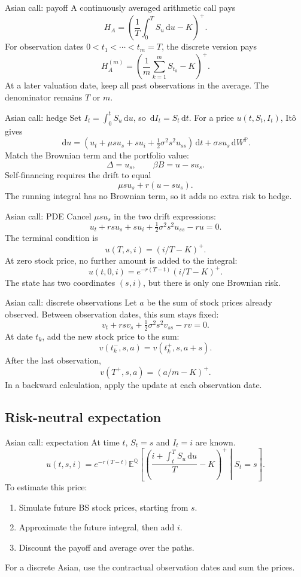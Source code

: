 \documentclass[handout,10pt,t,aspectratio=169]{beamer}
\newcommand{\E}{\mathbb E}
\newcommand{\Q}{\mathbb Q}
\newcommand{\Pp}{\mathbb P}
\newcommand{\dd}{\,\mathrm d}
\begin{document}
\begin{frame}{Asian call: payoff}
\small
A continuously averaged arithmetic call pays
\[
 H_A=\left(\frac1T\int_0^T S_u\dd u-K\right)^+.
\]
For observation dates \(0<t_1<\cdots<t_m=T\), the discrete version pays
\[
 H_A^{(m)}=\left(\frac1m\sum_{k=1}^m S_{t_k}-K\right)^+.
\]
At a later valuation date, keep all past observations in the average.
The denominator remains \(T\) or \(m\).
\end{frame}

\begin{frame}{Asian call: hedge}
\small
Set \(I_t=\int_0^tS_u\dd u\), so \(\dd I_t=S_t\dd t\).
For a price \(u(t,S_t,I_t)\), It\^o gives
\[
 \dd u=(u_t+\mu s u_s+s u_i+\tfrac12\sigma^2s^2u_{ss})\dd t
       +\sigma s u_s\dd W^\Pp.
\]
Match the Brownian term and the portfolio value:
\[
 \boxed{\Delta=u_s,\qquad\beta B=u-su_s.}
\]
Self-financing requires the drift to equal
\[
 \mu s u_s+r(u-su_s).
\]
The running integral has no Brownian term, so it adds no extra risk to hedge.
\end{frame}

\begin{frame}{Asian call: PDE}
\small
Cancel \(\mu s u_s\) in the two drift expressions:
\[
 \boxed{u_t+rsu_s+s u_i+\tfrac12\sigma^2s^2u_{ss}-ru=0.}
\]
The terminal condition is
\[
 u(T,s,i)=(i/T-K)^+.
\]
At zero stock price, no further amount is added to the integral:
\[
 u(t,0,i)=e^{-r(T-t)}(i/T-K)^+.
\]
The state has two coordinates \((s,i)\), but there is only one Brownian risk.
\end{frame}

\begin{frame}{Asian call: discrete observations}
\small
Let \(a\) be the sum of stock prices already observed.
Between observation dates, this sum stays fixed:
\[
 v_t+rsv_s+\tfrac12\sigma^2s^2v_{ss}-rv=0.
\]
At date \(t_k\), add the new stock price to the sum:
\[
 \boxed{v(t_k^-,s,a)=v(t_k^+,s,a+s).}
\]
After the last observation,
\[
 v(T^+,s,a)=(a/m-K)^+.
\]
In a backward calculation, apply the update at each observation date.
\end{frame}

\subsection{Risk-neutral expectation}

\begin{frame}{Asian call: expectation}
\small
At time \(t\), \(S_t=s\) and \(I_t=i\) are known.
\[
 \boxed{u(t,s,i)=e^{-r(T-t)}\E^\Q\!\left[
 \left(\frac{i+\int_t^T S_u\dd u}{T}-K\right)^+
 \middle|S_t=s\right].}
\]
To estimate this price:
\begin{enumerate}
\item Simulate future BS stock prices, starting from \(s\).
\item Approximate the future integral, then add \(i\).
\item Discount the payoff and average over the paths.
\end{enumerate}
For a discrete Asian, use the contractual observation dates and sum the prices.
\end{frame}
\end{document}
